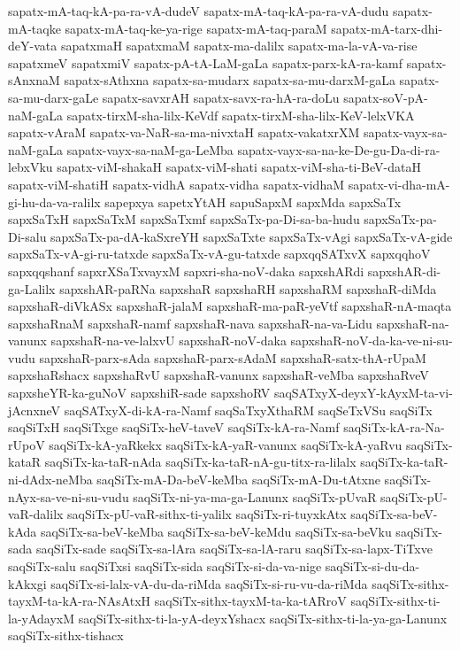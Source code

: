 {sapatx-mA-taq-kA-pa-ra-vA-dudeV
sapatx-mA-taq-kA-pa-ra-vA-dudu
sapatx-mA-taqke
sapatx-mA-taq-ke-ya-rige
sapatx-mA-taq-paraM
sapatx-mA-tarx-dhi-deY-vata
sapatxmaH
sapatxmaM
sapatx-ma-dalilx
sapatx-ma-la-vA-va-rise
sapatxmeV
sapatxmiV
sapatx-pA-tA-LaM-gaLa
sapatx-parx-kA-ra-kamf
sapatx-sAnxnaM
sapatx-sAthxna
sapatx-sa-mudarx
sapatx-sa-mu-darxM-gaLa
sapatx-sa-mu-darx-gaLe
sapatx-savxrAH
sapatx-savx-ra-hA-ra-doLu
sapatx-soV-pA-naM-gaLa
sapatx-tirxM-sha-lilx-KeVdf
sapatx-tirxM-sha-lilx-KeV-lelxVKA
sapatx-vAraM
sapatx-va-NaR-sa-ma-nivxtaH
sapatx-vakatxrXM
sapatx-vayx-sa-naM-gaLa
sapatx-vayx-sa-naM-ga-LeMba
sapatx-vayx-sa-na-ke-De-gu-Da-di-ra-lebxVku
sapatx-viM-shakaH
sapatx-viM-shati
sapatx-viM-sha-ti-BeV-dataH
sapatx-viM-shatiH
sapatx-vidhA
sapatx-vidha
sapatx-vidhaM
sapatx-vi-dha-mA-gi-hu-da-va-ralilx
sapepxya
sapetxYtAH
sapuSapxM
sapxMda
sapxSaTx
sapxSaTxH
sapxSaTxM
sapxSaTxmf
sapxSaTx-pa-Di-sa-ba-hudu
sapxSaTx-pa-Di-salu
sapxSaTx-pa-dA-kaSxreYH
sapxSaTxte
sapxSaTx-vAgi
sapxSaTx-vA-gide
sapxSaTx-vA-gi-ru-tatxde
sapxSaTx-vA-gu-tatxde
sapxqqSATxvX
sapxqqhoV
sapxqqshanf
sapxrXSaTxvayxM
sapxri-sha-noV-daka
sapxshARdi
sapxshAR-di-ga-Lalilx
sapxshAR-paRNa
sapxshaR
sapxshaRH
sapxshaRM
sapxshaR-diMda
sapxshaR-diVkASx
sapxshaR-jalaM
sapxshaR-ma-paR-yeVtf
sapxshaR-nA-maqta
sapxshaRnaM
sapxshaR-namf
sapxshaR-nava
sapxshaR-na-va-Lidu
sapxshaR-na-vanunx
sapxshaR-na-ve-lalxvU
sapxshaR-noV-daka
sapxshaR-noV-da-ka-ve-ni-su-vudu
sapxshaR-parx-sAda
sapxshaR-parx-sAdaM
sapxshaR-satx-thA-rUpaM
sapxshaRshacx
sapxshaRvU
sapxshaR-vanunx
sapxshaR-veMba
sapxshaRveV
sapxsheYR-ka-guNoV
sapxshiR-sade
sapxshoRV
saqSATxyX-deyxY-kAyxM-ta-vi-jAcnxneV
saqSATxyX-di-kA-ra-Namf
saqSaTxyXthaRM
saqSeTxVSu
saqSiTx
saqSiTxH
saqSiTxge
saqSiTx-heV-taveV
saqSiTx-kA-ra-Namf
saqSiTx-kA-ra-Na-rUpoV
saqSiTx-kA-yaRkekx
saqSiTx-kA-yaR-vanunx
saqSiTx-kA-yaRvu
saqSiTx-kataR
saqSiTx-ka-taR-nAda
saqSiTx-ka-taR-nA-gu-titx-ra-lilalx
saqSiTx-ka-taR-ni-dAdx-neMba
saqSiTx-mA-Da-beV-keMba
saqSiTx-mA-Du-tAtxne
saqSiTx-nAyx-sa-ve-ni-su-vudu
saqSiTx-ni-ya-ma-ga-Lanunx
saqSiTx-pUvaR
saqSiTx-pU-vaR-dalilx
saqSiTx-pU-vaR-sithx-ti-yalilx
saqSiTx-ri-tuyxkAtx
saqSiTx-sa-beV-kAda
saqSiTx-sa-beV-keMba
saqSiTx-sa-beV-keMdu
saqSiTx-sa-beVku
saqSiTx-sada
saqSiTx-sade
saqSiTx-sa-lAra
saqSiTx-sa-lA-raru
saqSiTx-sa-lapx-TiTxve
saqSiTx-salu
saqSiTxsi
saqSiTx-sida
saqSiTx-si-da-va-nige
saqSiTx-si-du-da-kAkxgi
saqSiTx-si-lalx-vA-du-da-riMda
saqSiTx-si-ru-vu-da-riMda
saqSiTx-sithx-tayxM-ta-kA-ra-NAsAtxH
saqSiTx-sithx-tayxM-ta-ka-tARroV
saqSiTx-sithx-ti-la-yAdayxM
saqSiTx-sithx-ti-la-yA-deyxYshacx
saqSiTx-sithx-ti-la-ya-ga-Lanunx
saqSiTx-sithx-tishacx
}
